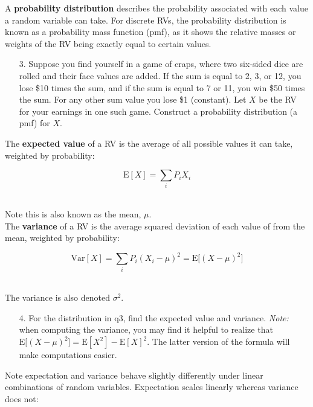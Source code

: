 \documentclass[10pt]{extarticle}
\newcommand{\E}{\text{E}}
\newcommand{\Var}{\text{Var}}
\begin{document}
\hfill

A {\bf probability distribution} describes the probability associated with each value a random variable can take. For discrete RVs, the probability distribution is known as a probability mass function (pmf), as it shows the relative masses or weights of the RV being exactly equal to certain values.   

\hfill 

\begin{itemize}

	\item[3.] Suppose you find yourself in a game of craps, where two six-sided dice are rolled and their face values are added. If the sum is equal to 2, 3, or 12, you lose \$10 times the sum, and if the sum is equal to 7 or 11, you win \$50 times the sum. For any other sum value you lose \$1 (constant). Let $X$ be the RV for your earnings in one such game. Construct a probability distribution (a pmf) for $X$.  

\end{itemize}

\hfill  

The {\bf expected value} of a RV is the average of all possible values it can take, weighted by probability:  

$$\E[X] = \sum_i P_i X_i$$ \ 

Note this is also known as the mean, $\mu$. \\

The {\bf variance} of a RV is the average squared deviation of each value of from the mean, weighted by probability: 

$$\Var[X] = \sum_i  P_i (X_i - \mu)^2 = \E \big[ (X - \mu )^2 \big]$$ \

The variance is also denoted $\sigma^2$. 

\hfill 

\begin{itemize}

	\item[4.] For the distribution in q3, find the expected value and variance. {\it Note:} when computing the variance, you may find it helpful to realize that $\E \big[ (X - \mu )^2 \big] = \E[X^2] - \E[X]^2$. The latter version of the formula will make computations easier. 

\end{itemize}

\hfill 

Note expectation and variance behave slightly differently under linear combinations of random variables. Expectation scales linearly whereas variance does not:
\end{document}
